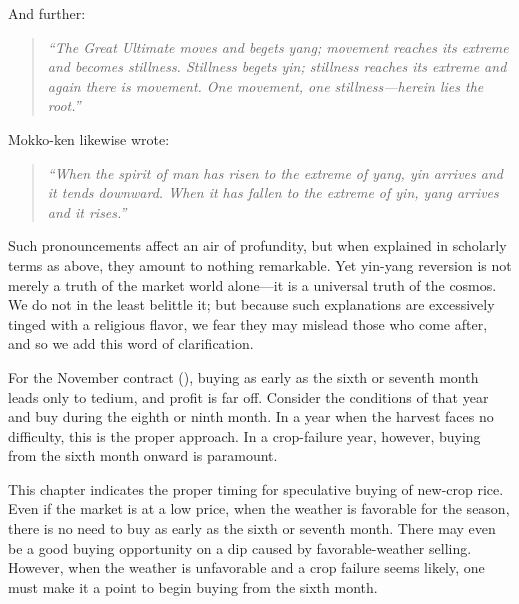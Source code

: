 And further:

\begin{quote}
\textit{``The Great Ultimate moves and begets yang; movement reaches its
extreme and becomes stillness. Stillness begets yin; stillness reaches
its extreme and again there is movement. One movement, one
stillness---herein lies the root.''}
\end{quote}

Mokko-ken likewise wrote:

\begin{quote}
\textit{``When the spirit of man has risen to the extreme of yang, yin
arrives and it tends downward. When it has fallen to the extreme of yin,
yang arrives and it rises.''}
\end{quote}

Such pronouncements affect an air of profundity, but when explained in
scholarly terms as above, they amount to nothing remarkable. Yet yin-yang
reversion is not merely a truth of the market world alone---it is a
universal truth of the cosmos. We do not in the least belittle it; but
because such explanations are excessively tinged with a religious
flavor, we fear they may mislead those who come after, and so we add
this word of clarification.


\begin{sokyubox}
{\small\itshape\color{sokyubar} }

\medskip
For the November contract (), buying as
early as the sixth or seventh month leads only to tedium, and profit is
far off. Consider the conditions of that year and buy during the eighth
or ninth month. In a year when the harvest faces no difficulty, this is
the proper approach. In a crop-failure year, however, buying from the
sixth month onward is paramount.
\end{sokyubox}

\commentary
This chapter indicates the proper timing for speculative buying of
new-crop rice. Even if the market is at a low price, when the weather is
favorable for the season, there is no need to buy as early as the sixth
or seventh month. There may even be a good buying opportunity on a dip
caused by favorable-weather selling. However, when the weather is
unfavorable and a crop failure seems likely, one must make it a point to
begin buying from the sixth month.

